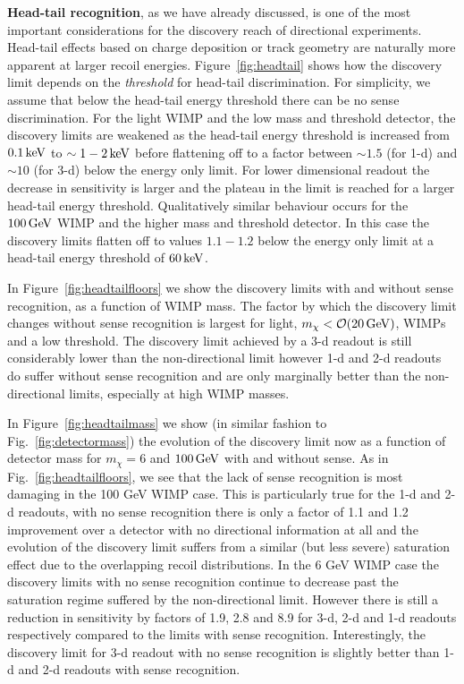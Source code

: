 {\bf Head-tail recognition}, as we have already discussed, is one of the most important considerations for the discovery reach of directional experiments. Head-tail effects based on charge deposition or track geometry are naturally more apparent at larger recoil energies. Figure~\ref{fig:headtail} shows how the discovery limit depends on the {\it threshold} for head-tail discrimination.
For simplicity, we assume that below the head-tail energy threshold there can be no sense discrimination.
For the light WIMP and the low mass and threshold detector, the discovery limits are weakened as the head-tail energy threshold is increased from $0.1 \, {\rm keV}$ to $\sim 1-2 \, {\rm keV}$ before flattening off to a factor between $\sim 1.5$ (for 1-d)  and $\sim 10$ (for 3-d) below the energy only limit. For lower dimensional readout the decrease in sensitivity is larger and the plateau in the limit is reached for a larger head-tail energy threshold. Qualitatively similar behaviour occurs for the $100 \, {\rm GeV} $ WIMP and the higher mass and threshold detector. In this case the discovery limits flatten off to values $1.1 - 1.2$ below the
energy only limit at a head-tail energy threshold of $60 \, {\rm keV}$. 

In Figure~\ref{fig:headtailfloors} we show the discovery limits with and without sense recognition, as a function of WIMP mass. The factor by which the discovery limit changes without sense recognition is largest for light, $m_{\chi} < {\cal O}(20 \, {\rm GeV})$, WIMPs and a low threshold. The discovery limit achieved by a 3-d readout is still considerably lower than the non-directional limit however 1-d and 2-d readouts do suffer without sense recognition and are only marginally better than the non-directional limits, especially at high WIMP masses.

In Figure~\ref{fig:headtailmass} we show (in similar fashion to Fig.~\ref{fig:detectormass}) the evolution of the discovery limit now as a function of detector mass for $m_{\chi} = 6$ and $100 \, {\rm GeV} $ with and without sense.
As in Fig.~\ref{fig:headtailfloors}, we see that the lack of sense recognition is most damaging in the 100 GeV WIMP case. This is particularly true for the 1-d and 2-d readouts, with no sense recognition there is only a factor of 1.1 and 1.2 improvement over a detector with no directional information at all and the evolution of the discovery limit suffers from a similar (but less severe) saturation effect due to the overlapping recoil distributions. In the 6 GeV WIMP case the discovery limits with no sense recognition continue to decrease past the saturation regime suffered by the non-directional limit. However there is still a reduction in sensitivity by factors of 1.9, 2.8 and 8.9 for 3-d, 2-d and 1-d readouts respectively compared to the limits with sense recognition. Interestingly, the discovery limit for 3-d readout with no sense recognition is slightly better than 1-d and 2-d readouts with sense recognition. 

